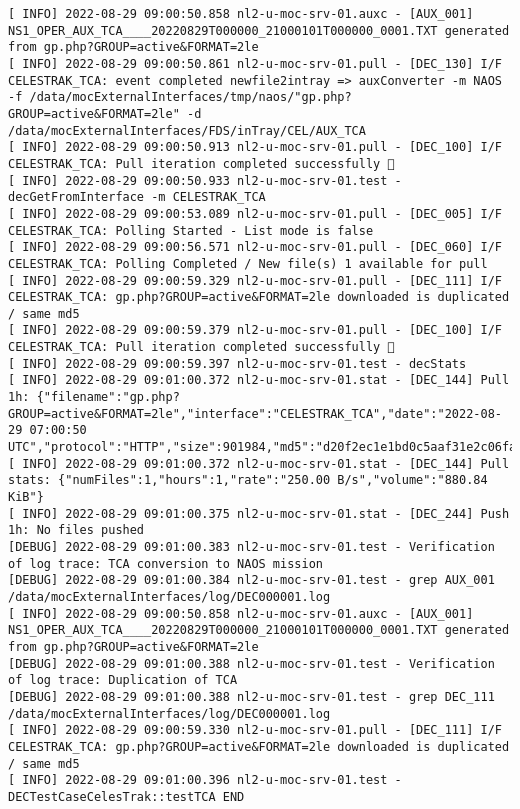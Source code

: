 \documentclass[dec_sum_main.tex]{subfiles}
\begin{document}
\begin{Verbatim}[fontsize=\tiny]
[ INFO] 2022-08-29 09:00:50.858 nl2-u-moc-srv-01.auxc - [AUX_001] NS1_OPER_AUX_TCA____20220829T000000_21000101T000000_0001.TXT generated from gp.php?GROUP=active&FORMAT=2le
[ INFO] 2022-08-29 09:00:50.861 nl2-u-moc-srv-01.pull - [DEC_130] I/F CELESTRAK_TCA: event completed newfile2intray => auxConverter -m NAOS -f /data/mocExternalInterfaces/tmp/naos/"gp.php?GROUP=active&FORMAT=2le" -d /data/mocExternalInterfaces/FDS/inTray/CEL/AUX_TCA
[ INFO] 2022-08-29 09:00:50.913 nl2-u-moc-srv-01.pull - [DEC_100] I/F CELESTRAK_TCA: Pull iteration completed successfully 🕺
[ INFO] 2022-08-29 09:00:50.933 nl2-u-moc-srv-01.test - decGetFromInterface -m CELESTRAK_TCA
[ INFO] 2022-08-29 09:00:53.089 nl2-u-moc-srv-01.pull - [DEC_005] I/F CELESTRAK_TCA: Polling Started - List mode is false
[ INFO] 2022-08-29 09:00:56.571 nl2-u-moc-srv-01.pull - [DEC_060] I/F CELESTRAK_TCA: Polling Completed / New file(s) 1 available for pull
[ INFO] 2022-08-29 09:00:59.329 nl2-u-moc-srv-01.pull - [DEC_111] I/F CELESTRAK_TCA: gp.php?GROUP=active&FORMAT=2le downloaded is duplicated / same md5
[ INFO] 2022-08-29 09:00:59.379 nl2-u-moc-srv-01.pull - [DEC_100] I/F CELESTRAK_TCA: Pull iteration completed successfully 🕺
[ INFO] 2022-08-29 09:00:59.397 nl2-u-moc-srv-01.test - decStats
[ INFO] 2022-08-29 09:01:00.372 nl2-u-moc-srv-01.stat - [DEC_144] Pull 1h: {"filename":"gp.php?GROUP=active&FORMAT=2le","interface":"CELESTRAK_TCA","date":"2022-08-29 07:00:50 UTC","protocol":"HTTP","size":901984,"md5":"d20f2ec1e1bd0c5aaf31e2c06fa41193"}
[ INFO] 2022-08-29 09:01:00.372 nl2-u-moc-srv-01.stat - [DEC_144] Pull stats: {"numFiles":1,"hours":1,"rate":"250.00 B/s","volume":"880.84 KiB"}
[ INFO] 2022-08-29 09:01:00.375 nl2-u-moc-srv-01.stat - [DEC_244] Push 1h: No files pushed
[DEBUG] 2022-08-29 09:01:00.383 nl2-u-moc-srv-01.test - Verification of log trace: TCA conversion to NAOS mission
[DEBUG] 2022-08-29 09:01:00.384 nl2-u-moc-srv-01.test - grep AUX_001 /data/mocExternalInterfaces/log/DEC000001.log
[ INFO] 2022-08-29 09:00:50.858 nl2-u-moc-srv-01.auxc - [AUX_001] NS1_OPER_AUX_TCA____20220829T000000_21000101T000000_0001.TXT generated from gp.php?GROUP=active&FORMAT=2le
[DEBUG] 2022-08-29 09:01:00.388 nl2-u-moc-srv-01.test - Verification of log trace: Duplication of TCA
[DEBUG] 2022-08-29 09:01:00.388 nl2-u-moc-srv-01.test - grep DEC_111 /data/mocExternalInterfaces/log/DEC000001.log
[ INFO] 2022-08-29 09:00:59.330 nl2-u-moc-srv-01.pull - [DEC_111] I/F CELESTRAK_TCA: gp.php?GROUP=active&FORMAT=2le downloaded is duplicated / same md5
[ INFO] 2022-08-29 09:01:00.396 nl2-u-moc-srv-01.test - DECTestCaseCelesTrak::testTCA END
\end{Verbatim}
\end{document}
